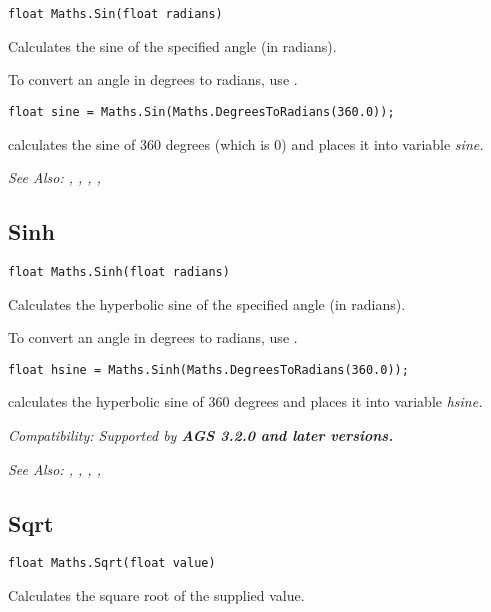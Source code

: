 \begin{verbatim}
float Maths.Sin(float radians)
\end{verbatim}
Calculates the sine of the specified angle (in radians).

To convert an angle in degrees to radians, use .

\begin{verbatim}
float sine = Maths.Sin(Maths.DegreesToRadians(360.0));
\end{verbatim}
calculates the sine of 360 degrees (which is 0) and places it into variable \it{sine}.

\it{See Also:} ,
,
,
, 


\subsection{Sinh}\label{Maths.Sinh}%

\begin{verbatim}
float Maths.Sinh(float radians)
\end{verbatim}
Calculates the hyperbolic sine of the specified angle (in radians).

To convert an angle in degrees to radians, use .

\begin{verbatim}
float hsine = Maths.Sinh(Maths.DegreesToRadians(360.0));
\end{verbatim}
calculates the hyperbolic sine of 360 degrees and places it into variable \it{hsine}.

\it{Compatibility:} Supported by \bf{AGS 3.2.0} and later versions.

\it{See Also:} ,
,
,
, 


\subsection{Sqrt}\label{Maths.Sqrt}%

\begin{verbatim}
float Maths.Sqrt(float value)
\end{verbatim}
Calculates the square root of the supplied value.

